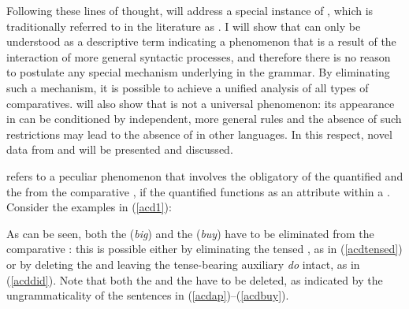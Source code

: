 Following these lines of thought,  will address a special instance of , which is traditionally referred to in the literature as . I will show that  can only be understood as a descriptive term indicating a phenomenon that is a result of the interaction of more general syntactic processes, and therefore there is no reason to postulate any special mechanism underlying  in the grammar. By eliminating such a mechanism, it is possible to achieve a unified analysis of all types of comparatives.  will also show that  is not a universal phenomenon: its appearance in  can be conditioned by independent, more general rules and the absence of such restrictions may lead to the absence of  in other languages. In this respect, novel data from  and  will be presented and discussed.

 refers to a peculiar phenomenon that involves the obligatory  of the quantified  and the  from the comparative , if the quantified  functions as an attribute within a . Consider the examples in (\ref{acd1}):

\ea \label{acd1}
 \label{acddid}
 \label{acdtensed}
 \label{acdap}
 \label{acdbuy}
\z
\z

As can be seen, both the  (\textit{big}) and the  (\textit{buy}) have to be eliminated from the comparative : this is possible either by eliminating the tensed , as in (\ref{acdtensed}) or by deleting the  and leaving the tense-bearing auxiliary \textit{do} intact, as in (\ref{acddid}). Note that both the  and the  have to be deleted, as indicated by the ungrammaticality of the sentences in (\ref{acdap})–(\ref{acdbuy}).

